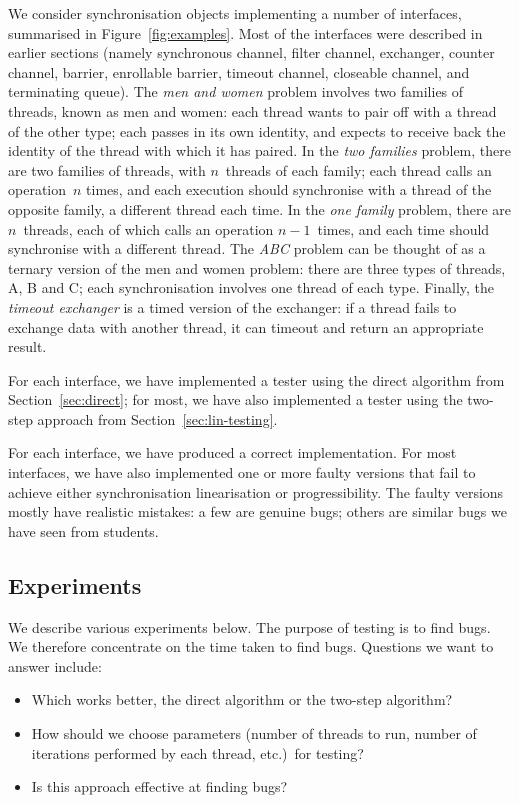 We consider synchronisation objects implementing a number of interfaces,
summarised in Figure~\ref{fig:examples}.  Most of the interfaces were
described in earlier sections (namely synchronous channel, filter channel,
exchanger, counter channel, barrier, enrollable barrier, timeout channel,
closeable channel, and terminating queue).
%
The \emph{men and women} problem involves two families of threads, known as
men and women: each thread wants to pair off with a thread of the other type;
each passes in its own identity, and expects to receive back the identity of
the thread with which it has paired.  
%
In the \emph{two families} problem,
there are two families of threads, with $n$~threads of each family; each
thread calls an operation~$n$ times, and each execution should synchronise
with a thread of the opposite family, a different thread each time.  In the
\emph{one family} problem, there are $n$~threads, each of which calls an
operation $n-1$~times, and each time should synchronise with a different
thread.  
%
The \emph{ABC} problem can be thought of as a ternary version of the men and
women problem: there are three types of threads, A, B and C; each
synchronisation involves one thread of each type.  
%
Finally, the \emph{timeout exchanger} is a timed version of the exchanger: if
a thread fails to exchange data with another thread, it can timeout and return
an appropriate result.

For each interface, we have implemented a tester using the direct algorithm
from Section~\ref{sec:direct}; for most, we have also implemented a tester
using the two-step approach from Section~\ref{sec:lin-testing}.

For each interface, we have produced a correct implementation.  For most
interfaces, we have also implemented one or more faulty versions that fail to
achieve either synchronisation linearisation or progressibility.  The faulty
versions mostly have realistic mistakes: a few are genuine bugs; others are
similar bugs we have seen from students.


\subsection{Experiments}

We describe various experiments below.  The purpose of testing is to find
bugs.  We therefore concentrate on the time taken to find bugs.  Questions we
want to answer include:
\begin{itemize}
\item Which works better, the direct algorithm or the two-step algorithm?  
\item How should we choose parameters (number of threads to run, number of
  iterations performed by each thread, etc.)\ for testing?  
\item Is this approach effective at finding bugs?
\end{itemize}


